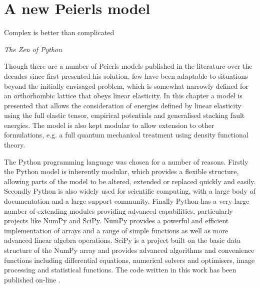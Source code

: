 
\chapter{A new Peierls model}
\label{chap:peierls_model}
\graphicspath{{peierls_model/Figs/}}

\epigraph{Complex is better than complicated}{\emph{The Zen of Python}}


Though there are a number \cite{Nabarro1947,Huntington1955, puls1976, Vitek1992,  Bulatov1997, Lubarda2007, Clegg2006,Gouriet2015} of Peierls models published in the literature over the decades since \citet{Peierls1940} first presented his solution, few have been adaptable to situations beyond the initially envisaged problem, which is somewhat narrowly defined for an orthorhombic lattice that obeys linear elasticity. In this chapter a model is presented that allows  the consideration of energies defined by linear elasticity using the full elastic tensor, empirical potentials and generalised stacking fault energies. The model is also kept modular to allow extension to other formulations, e.g. a full quantum mechanical treatment using density functional theory.

The Python programming language was chosen for a number of reasons. Firstly the Python model is inherently modular, which provides a flexible structure, allowing parts of the model to be altered, extended or replaced quickly and easily. Secondly Python is also widely used for scientific computing, with a large body of documentation and a large support community. Finally Python has a very large number of extending modules providing advanced capabilities, particularly projects like NumPy and SciPy. NumPy provides a powerful and efficient implementation of arrays and a range of simple functions as well as more advanced linear algebra operations. SciPy is a project built on the basic data structure of the NumPy array and provides advanced algorithms and convenience functions including differential equations, numerical solvers and optimisers, image processing and statistical functions. The code written in this work has been published on-line \cite{code}. 

